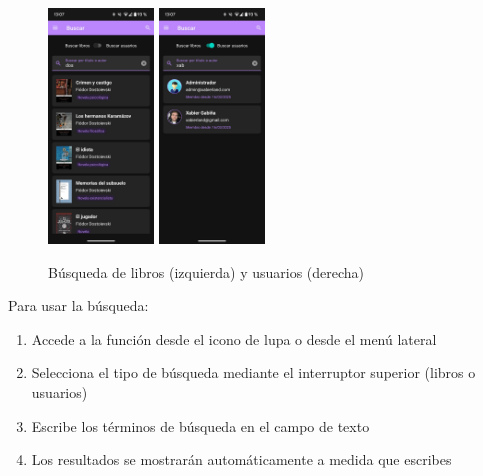\documentclass[a4paper,10pt]{report}
\begin{document}
    \begin{figure}[H]
      \centering
      \includegraphics[width=0.25\textwidth]{.img/buscador-libros.png}
      \hspace{1cm}
      \includegraphics[width=0.25\textwidth]{.img/buscador-usuarios.png}
      \caption{Búsqueda de libros (izquierda) y usuarios (derecha)}
      \label{fig:busqueda}
    \end{figure}
    
    Para usar la búsqueda:
    \begin{enumerate}
      \item Accede a la función desde el icono de lupa o desde el menú lateral
      \item Selecciona el tipo de búsqueda mediante el interruptor superior (libros o usuarios)
      \item Escribe los términos de búsqueda en el campo de texto
      \item Los resultados se mostrarán automáticamente a medida que escribes
    \end{enumerate}   
    
\end{document}
